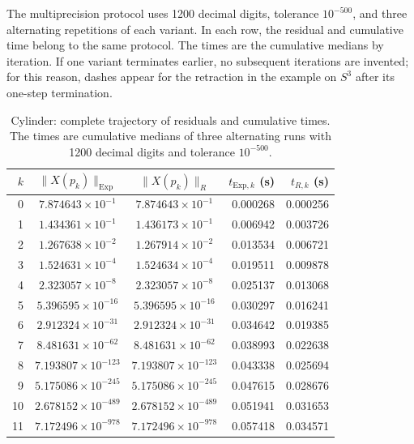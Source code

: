 \documentclass[11pt]{article}
\newcommand{\Exp}{\mathrm{Exp}}
\begin{document}
The multiprecision protocol uses 1200 decimal digits, tolerance
$10^{-500}$, and three alternating repetitions of each variant. In each row,
the residual and cumulative time belong to the same protocol. The times
are the cumulative medians by iteration. If one variant terminates earlier,
no subsequent iterations are invented; for this reason, dashes appear for the
retraction in the example on $S^3$ after its one-step termination.

\begin{table}[H]
\centering
\scriptsize
\setlength{\tabcolsep}{4.2pt}
\begin{tabular}{rccrr}
\toprule
$k$ & $\|X(p_k)\|_{\Exp}$ & $\|X(p_k)\|_R$
& $t_{\Exp,k}$ (s) & $t_{R,k}$ (s)\\
\midrule
0 & $7.874643\times10^{-1}$ & $7.874643\times10^{-1}$ & 0.000268 & 0.000256 \\
1 & $1.434361\times10^{-1}$ & $1.436173\times10^{-1}$ & 0.006942 & 0.003726 \\
2 & $1.267638\times10^{-2}$ & $1.267914\times10^{-2}$ & 0.013534 & 0.006721 \\
3 & $1.524631\times10^{-4}$ & $1.524634\times10^{-4}$ & 0.019511 & 0.009878 \\
4 & $2.323057\times10^{-8}$ & $2.323057\times10^{-8}$ & 0.025137 & 0.013068 \\
5 & $5.396595\times10^{-16}$ & $5.396595\times10^{-16}$ & 0.030297 & 0.016241 \\
6 & $2.912324\times10^{-31}$ & $2.912324\times10^{-31}$ & 0.034642 & 0.019385 \\
7 & $8.481631\times10^{-62}$ & $8.481631\times10^{-62}$ & 0.038993 & 0.022638 \\
8 & $7.193807\times10^{-123}$ & $7.193807\times10^{-123}$ & 0.043338 & 0.025694 \\
9 & $5.175086\times10^{-245}$ & $5.175086\times10^{-245}$ & 0.047615 & 0.028676 \\
10 & $2.678152\times10^{-489}$ & $2.678152\times10^{-489}$ & 0.051941 & 0.031653 \\
11 & $7.172496\times10^{-978}$ & $7.172496\times10^{-978}$ & 0.057418 & 0.034571 \\
\bottomrule
\end{tabular}
\caption{Cylinder: complete trajectory of residuals and cumulative times. The times are cumulative medians of three alternating runs with 1200 decimal digits and tolerance $10^{-500}$.}
\label{tab:supp_cylinder}
\end{table}
\end{document}
